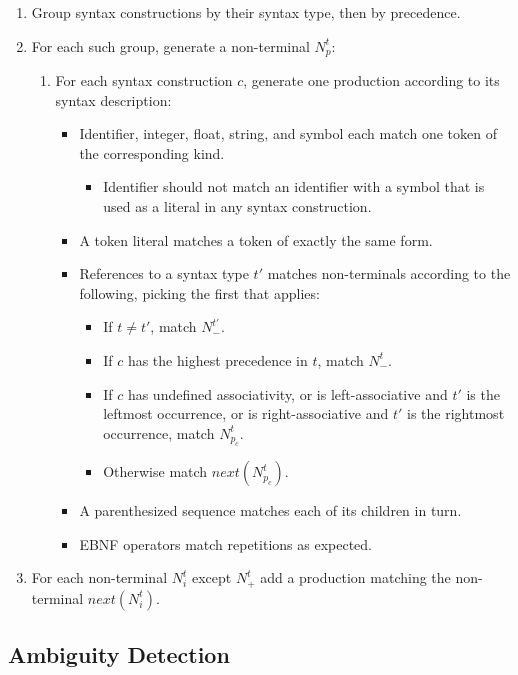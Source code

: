 \documentclass{kththesis}
\begin{document}
\begin{enumerate}
  \item Group syntax constructions by their syntax type, then by precedence.
  \item For each such group, generate a non-terminal $N^t_p$:
  \begin{enumerate}
    \item For each syntax construction $c$, generate one production according to its syntax description:
    \begin{itemize}
      \item Identifier, integer, float, string, and symbol each match one token of the corresponding kind.
      \begin{itemize}
        \item Identifier should not match an identifier with a symbol that is used as a literal in any syntax construction.
      \end{itemize}
      \item A token literal matches a token of exactly the same form.
      \item References to a syntax type $t'$ matches non-terminals according to the following, picking the first that applies:
      \begin{itemize}
        \item If $t \neq t'$, match $N^{t'}_-$.
        \item If $c$ has the highest precedence in $t$, match $N^t_-$.
        \item If $c$ has undefined associativity, or is left-associative and $t'$ is the leftmost occurrence, or is right-associative and $t'$ is the rightmost occurrence, match $N^t_{p_c}$.
        \item Otherwise match $next(N^t_{p_c})$.
      \end{itemize}
      \item A parenthesized sequence matches each of its children in turn.
      \item EBNF operators match repetitions as expected.
    \end{itemize}
  \end{enumerate}
  \item For each non-terminal $N^t_i$ except $N^t_+$ add a production matching the non-terminal $next(N^t_i)$.
\end{enumerate}
\mathligson

\subsection{Ambiguity Detection} \label{sec:implementation-ambiguity-detection}
\end{document}
